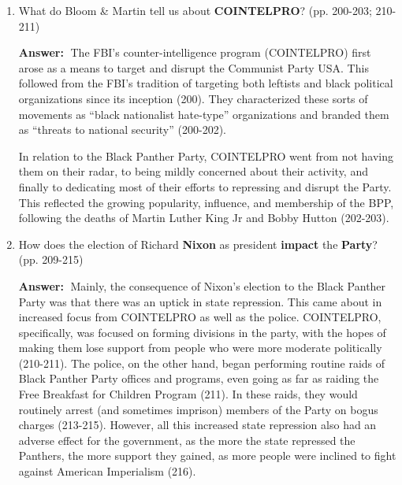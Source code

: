\documentclass{article}
\newcommand{\answer}{\textbf{Answer:}$\;$}
\begin{document}
\begin{enumerate}[label=\arabic*)]


    
    \item What do Bloom \& Martin tell us about \textbf{COINTELPRO}? (pp. 200-203; 210-211)
    
    \answer
    The FBI's counter-intelligence program (COINTELPRO) first arose as a means to target and disrupt the Communist Party USA.
    This followed from the FBI's tradition of targeting both leftists and black political organizations since its inception (200).
    They characterized these sorts of movements as ``black nationalist hate-type'' organizations and branded them as ``threats to national security'' (200-202).
    
    In relation to the Black Panther Party, COINTELPRO went from not having them on their radar, to being mildly concerned about their activity, and finally to dedicating most of their efforts to repressing and disrupt the Party.
    This reflected the growing popularity, influence, and membership of the BPP, following the deaths of Martin Luther King Jr and Bobby Hutton (202-203).
    

    \item How does the election of Richard \textbf{Nixon} as president \textbf{impact} the \textbf{Party}? (pp. 209-215)
    
    \answer
    Mainly, the consequence of Nixon's election to the Black Panther Party was that there was an uptick in state repression.
    This came about in increased focus from COINTELPRO as well as the police.
    COINTELPRO, specifically, was focused on forming divisions in the party, with the hopes of making them lose support from people who were more moderate politically (210-211).
    The police, on the other hand, began performing routine raids of Black Panther Party offices and programs, even going as far as raiding the Free Breakfast for Children Program (211).
    In these raids, they would routinely arrest (and sometimes imprison) members of the Party on bogus charges (213-215).
    However, all this increased state repression also had an adverse effect for the government, as the more the state repressed the Panthers, the more support they gained, as more people were inclined to fight against American Imperialism (216).
    
    
\end{enumerate}
 
\end{document}
